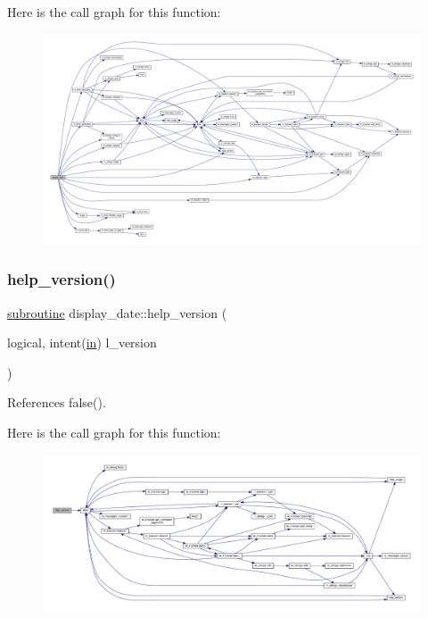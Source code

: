 Here is the call graph for this function\+:
\nopagebreak
\begin{figure}[H]
\begin{center}
\leavevmode
\includegraphics[width=350pt]{now_8f90_a0a9caf8a3d791fca5628f441ed1b18ef_cgraph}
\end{center}
\end{figure}
\mbox{\label{now_8f90_a52114522a23078dbabe7b35ced8a9ae5}} 
\subsubsection{\texorpdfstring{help\+\_\+version()}{help\_version()}}
{\footnotesize\ttfamily \hyperlink{M__stopwatch_83_8txt_acfbcff50169d691ff02d4a123ed70482}{subroutine} display\+\_\+date\+::help\+\_\+version (\begin{DoxyParamCaption}\item[{logical, intent(\hyperlink{M__journal_83_8txt_afce72651d1eed785a2132bee863b2f38}{in})}]{l\+\_\+version }\end{DoxyParamCaption})}



References false().

Here is the call graph for this function\+:
\nopagebreak
\begin{figure}[H]
\begin{center}
\leavevmode
\includegraphics[width=350pt]{now_8f90_a52114522a23078dbabe7b35ced8a9ae5_cgraph}
\end{center}
\end{figure}
\mbox{\label{now_8f90_a2f52503ff8f83f2a588647231e597e58}} 
